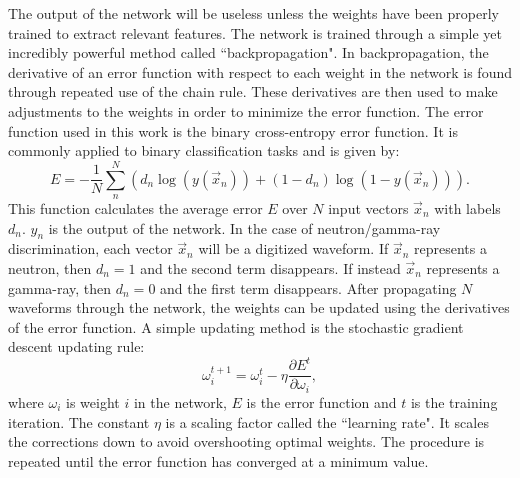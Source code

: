 \documentclass[main.tex]{subfiles}
\begin{document}
The output of the network will be useless unless the weights have been properly trained to extract relevant features. The network is trained through a simple yet incredibly powerful method called ``backpropagation". In backpropagation, the derivative of an error function with respect to each weight in the network is found through repeated use of the chain rule. These derivatives are then used to make adjustments to the weights in order to minimize the error function.
The error function used in this work is the binary cross-entropy error function. It is commonly applied to binary classification tasks and is given by:
\begin{equation}
	E = -\frac{1}{N}\sum_n^N\left(	d_n\log(y(\vec x_n))+(1-d_n)\log(1-y(\vec x_n))	\right).
\end{equation}
This function calculates the average error $E$ over $N$ input vectors $\vec x_n$ with labels $d_n$. $y_n$ is the output of the network. In the case of neutron/gamma-ray discrimination, each vector $\vec x_n$ will be a digitized waveform. If $\vec x_n$ represents a neutron, then $d_n=1$ and the second term disappears. If instead $\vec x_n$ represents a gamma-ray, then $d_n=0$ and the first term disappears.
After propagating $N$ waveforms through the network, the weights can be updated using the derivatives of the error function. A simple updating method is the stochastic gradient descent updating rule:
\begin{equation}
	\omega^{t+1}_i = \omega^{t}_i - \eta\frac{\partial E^t}{\partial \omega_i},
\end{equation}
where $\omega_i$ is weight $i$ in the network, $E$ is the error function and $t$ is the training iteration. The constant $\eta$ is a scaling factor called the ``learning rate". It scales the corrections down to avoid overshooting optimal weights. The procedure is repeated until the error function has converged at a minimum value.
\end{document}
